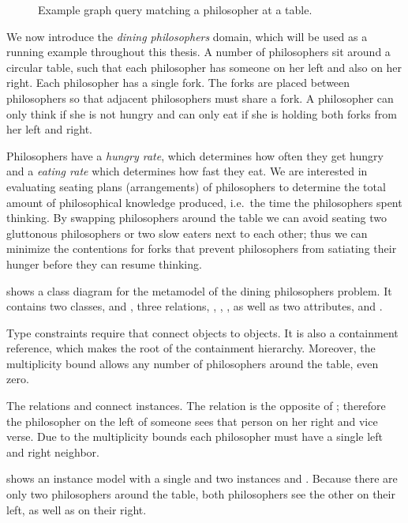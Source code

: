 \begin{figure}
\begin{minipage}[t]{0.3333\textwidth}
    \caption{\protect\RaggedRight Example graph query matching a philosopher at a table.}
    \label{fig:background:pattern}
  \end{minipage}%
\end{figure}

\begin{runningExample}\label{ex:background:running}
  We now introduce the \emph{dining philosophers} domain, which will be used as a running example throughout this thesis. A number of philosophers sit around a circular table, such that each philosopher has someone on her left and also on her right. Each philosopher has a single fork. The forks are placed between philosophers so that adjacent philosophers must share a fork. A philosopher can only think if she is not hungry and can only eat if she is holding both forks from her left and right.

  Philosophers have a \emph{hungry rate}, which determines how often they get hungry and a \emph{eating rate} which determines how fast they eat. We are interested in evaluating seating plans (arrangements) of philosophers to determine the total amount of philosophical knowledge produced, i.e.~the time the philosophers spent thinking. By swapping philosophers around the table we can avoid seating two gluttonous philosophers or two slow eaters next to each other; thus we can minimize the contentions for forks that prevent philosophers from satiating their hunger before they can resume thinking.

   shows a class diagram for the metamodel of the dining philosophers problem. It contains two classes,  and , three relations, , , , as well as two attributes,  and .

  Type constraints require that  connect  objects to  objects. It is also a containment reference, which makes  the root of the containment hierarchy. Moreover, the multiplicity bound \lit{[0..*]} allows any number of philosophers around the table, even zero.

  The relations  and  connect  instances. The relation  is the opposite of ; therefore the philosopher on the left of someone sees that person on her right and vice verse. Due to the multiplicity bounds \lit{[1]} each philosopher must have a single left and right neighbor.

   shows an instance model with a single   and two  instances  and . Because there are only two philosophers around the table, both philosophers see the other on their left, as well as on their right.
\end{runningExample}

